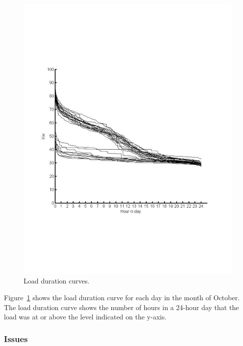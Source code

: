 \begin{figure}[htb!]
\begin{center}
\includegraphics[scale=0.4]{figs/LoadDurationCurvesWholeBuildingBLACK}
\caption{Load duration curves.}
\label{fig:ldc}
\end{center}
\end{figure}

Figure~\ref{fig:ldc} shows the load duration curve for each day in the month of October.  The load duration
curve shows the number of hours in a 24-hour day that the load was at or above the level indicated on the 
y-axis.

\subsubsection{Issues}

